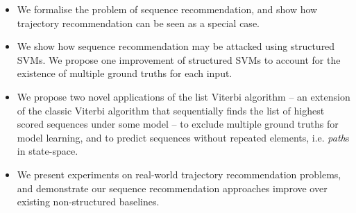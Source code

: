 \begin{itemize}[noitemsep,leftmargin=12pt]%
	\item We formalise the problem of sequence recommendation, %
          and show how trajectory recommendation can be seen as a special case. %

	\item We show how sequence recommendation may be attacked using structured SVMs. %
	We propose one improvement of structured SVMs %
    to account for the existence of multiple ground truths for each input. %

    \item We propose two novel applications of the list Viterbi algorithm -- an extension of the classic Viterbi algorithm that sequentially finds the list of highest scored sequences under some model --
to exclude multiple ground truths for model learning, %
and to predict sequences without repeated elements, i.e. {\em path}s in state-space. %

	\item We present experiments on real-world trajectory recommendation problems, and demonstrate our sequence recommendation approaches improve over existing non-structured baselines. %
\end{itemize}

